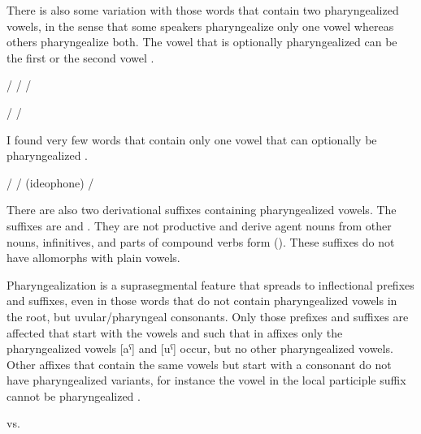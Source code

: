There is also some variation with those words that contain two pharyngealized vowels, in the sense that some speakers pharyngealize only one vowel whereas others pharyngealize both. The vowel that is optionally pharyngealized can be the first  or the second vowel .
%
\begin{exe}
	\label{ex:pharyngealization of first vowel or both vowels}
	\begin{xlist}
		\ex	{}\slash{} 
		\ex	{}\slash{} 
		\ex	{}\slash{} 
	\end{xlist}

	\label{ex:pharyngealization of second vowel or both vowels}
	\begin{xlist}
		\ex	{}\slash{} \sqt{secret, secretly}
		\ex	{}\slash{} \sqt{boy, son}
	\end{xlist}
\end{exe}

I found very few words that contain only one vowel that can optionally be pharyngealized .
%
\begin{exe}
	\ex	\label{ex:optional pharyngealization vowels phon}
	\begin{xlist}
		\ex	{}\slash{} \sqt{snow}
		\ex	{}\slash{}  (ideophone)
		\ex	{}\slash{} \sqt{wine}
	\end{xlist}
\end{exe}

There are also two derivational suffixes containing pharyngealized vowels. The suffixes are  and . They are not productive and derive agent nouns from other nouns, infinitives, and parts of compound verbs form (). These suffixes do not have allomorphs with plain vowels.

Pharyngealization is a suprasegmental feature that spreads to inflectional prefixes and suffixes, even in those words that do not contain pharyngealized vowels in the root, but uvular/pharyngeal consonants. Only those prefixes and suffixes are affected that start with the vowels  and  such that in affixes only the pharyngealized vowels [aˁ] and [uˁ] occur, but no other pharyngealized vowels. Other affixes that contain the same vowels but start with a consonant do not have pharyngealized variants, for instance the vowel in the local participle suffix  cannot be pharyngealized . 
%
\begin{exe}
	\ex	\label{ex:pharyngealization na phon}
\TabPositions{12em}
	  \tab vs.  
\end{exe}

